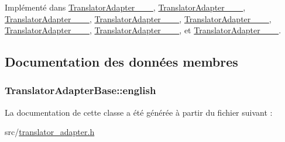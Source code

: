 Implémenté dans \hyperlink{class_translator_adapter__1__4__6_ab19b01d4e00c95ef1e6eb631fbe6ada4}{Translator\+Adapter\+\_\+\_\+\_}, \hyperlink{class_translator_adapter__1__5__4_a587a31dad925e47f206b6a0cda9eedd0}{Translator\+Adapter\+\_\+\_\+\_}, \hyperlink{class_translator_adapter__1__6__0_abc231eb2c1864ca9f878e7e5deb94f54}{Translator\+Adapter\+\_\+\_\+\_}, \hyperlink{class_translator_adapter__1__6__3_ab3d79abfb926c41bd7609eeb706654fe}{Translator\+Adapter\+\_\+\_\+\_}, \hyperlink{class_translator_adapter__1__7__5_a6e69d48e79a13c9d934f9af1a8befd8a}{Translator\+Adapter\+\_\+\_\+\_}, \hyperlink{class_translator_adapter__1__8__0_a47cedb130d9a178d9c632584d4f2abec}{Translator\+Adapter\+\_\+\_\+\_}, \hyperlink{class_translator_adapter__1__8__2_a307747456f69ab8dcb0c2be27f429e80}{Translator\+Adapter\+\_\+\_\+\_}, et \hyperlink{class_translator_adapter__1__8__4_a87dbcf9a99bf2ddfd9593461d331b714}{Translator\+Adapter\+\_\+\_\+\_}.



\subsection{Documentation des données membres}
\hypertarget{class_translator_adapter_base_a75fd1d1116debf9adacfef772a04a7b1}{}
\subsubsection[{english}]{ Translator\+Adapter\+Base\+::english\hspace{0.3cm}{\ttfamily [protected]}}\label{class_translator_adapter_base_a75fd1d1116debf9adacfef772a04a7b1}


La documentation de cette classe a été générée à partir du fichier suivant \+:\begin{DoxyCompactItemize}
\item 
src/\hyperlink{translator__adapter_8h}{translator\+\_\+adapter.\+h}\end{DoxyCompactItemize}
